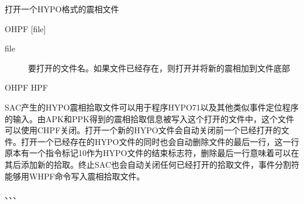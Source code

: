 \label{cmd:ohpf}

打开一个HYPO格式的震相文件

\begin{SACSTX}
OHPF [file]
\end{SACSTX}

\begin{description}
\item [file]  要打开的文件名。如果文件已经存在，则打开并将新的震相加到文件底部
\end{description}

\begin{SACDFT}
OHPF HPF
\end{SACDFT}

SAC产生的HYPO震相拾取文件可以用于程序HYPO71以及其他类似事件定位程序的输入。由APK和PPK得到的震相拾取信息被写入这个打开的文件中，这个文件可以使用CHPF关闭。打开一个新的HYPO文件会自动关闭前一个已经打开的文件。打开一个已经存在的HYPO文件的同时也会自动删除文件的最后一行，这一行原本有一个指令标记10作为HYPO文件的结束标志符，删除最后一行意味着可以在其后添加新的拾取。终止SAC也会自动关闭任何已经打开的拾取文件，事件分割符能够用WHPF命令写入震相拾取文件。

、、、
